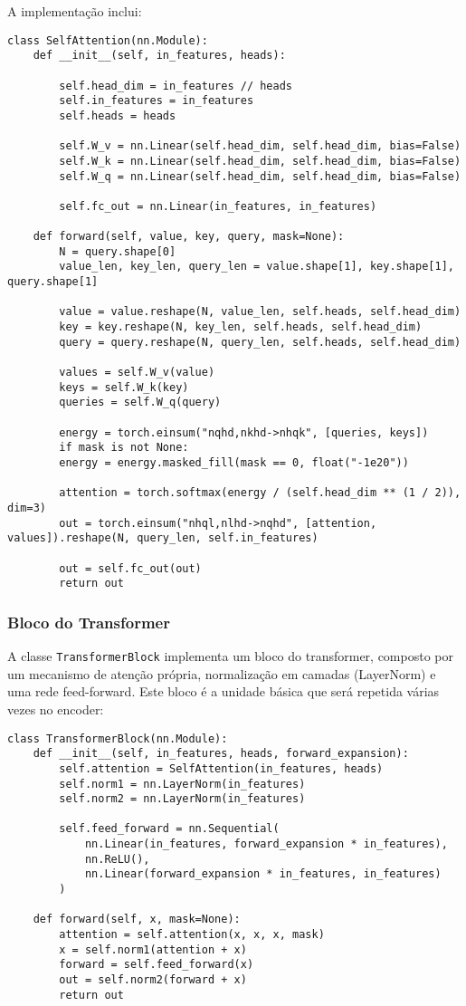 A implementação inclui:

\begin{verbatim}
class SelfAttention(nn.Module):
	def __init__(self, in_features, heads):
		
		self.head_dim = in_features // heads
		self.in_features = in_features
		self.heads = heads
		
		self.W_v = nn.Linear(self.head_dim, self.head_dim, bias=False)
		self.W_k = nn.Linear(self.head_dim, self.head_dim, bias=False)
		self.W_q = nn.Linear(self.head_dim, self.head_dim, bias=False)
		
		self.fc_out = nn.Linear(in_features, in_features)
		
	def forward(self, value, key, query, mask=None):
		N = query.shape[0]
		value_len, key_len, query_len = value.shape[1], key.shape[1], query.shape[1]
		
		value = value.reshape(N, value_len, self.heads, self.head_dim)
		key = key.reshape(N, key_len, self.heads, self.head_dim)
		query = query.reshape(N, query_len, self.heads, self.head_dim)
		
		values = self.W_v(value)
		keys = self.W_k(key)
		queries = self.W_q(query)
		
		energy = torch.einsum("nqhd,nkhd->nhqk", [queries, keys])
		if mask is not None:
		energy = energy.masked_fill(mask == 0, float("-1e20"))
		
		attention = torch.softmax(energy / (self.head_dim ** (1 / 2)), dim=3)
		out = torch.einsum("nhql,nlhd->nqhd", [attention, values]).reshape(N, query_len, self.in_features)
		
		out = self.fc_out(out)
		return out
\end{verbatim}

\subsubsection{Bloco do Transformer}

A classe \texttt{TransformerBlock} implementa um bloco do transformer, composto por um mecanismo de atenção própria, normalização em camadas (LayerNorm) e uma rede feed-forward. Este bloco é a unidade básica que será repetida várias vezes no encoder:

\begin{verbatim}
class TransformerBlock(nn.Module):
	def __init__(self, in_features, heads, forward_expansion):
		self.attention = SelfAttention(in_features, heads)
		self.norm1 = nn.LayerNorm(in_features)
		self.norm2 = nn.LayerNorm(in_features)
		
		self.feed_forward = nn.Sequential(
			nn.Linear(in_features, forward_expansion * in_features),
			nn.ReLU(),
			nn.Linear(forward_expansion * in_features, in_features)
		)
		
	def forward(self, x, mask=None):
		attention = self.attention(x, x, x, mask)
		x = self.norm1(attention + x)
		forward = self.feed_forward(x)
		out = self.norm2(forward + x)
		return out
\end{verbatim}

